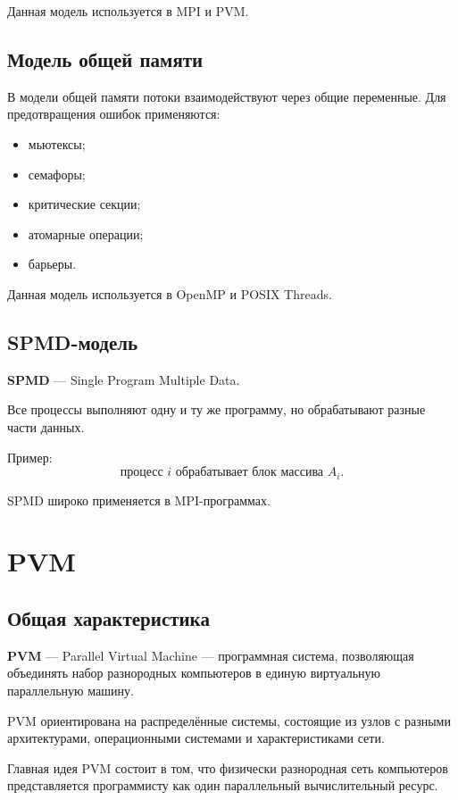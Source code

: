 \documentclass[12pt,a4paper]{article}
\begin{document}
Данная модель используется в MPI и PVM.

\subsection{Модель общей памяти}

В модели общей памяти потоки взаимодействуют через общие переменные. Для предотвращения ошибок применяются:
\begin{itemize}
    \item мьютексы;
    \item семафоры;
    \item критические секции;
    \item атомарные операции;
    \item барьеры.
\end{itemize}

Данная модель используется в OpenMP и POSIX Threads.

\subsection{SPMD-модель}

\textbf{SPMD} --- Single Program Multiple Data.

Все процессы выполняют одну и ту же программу, но обрабатывают разные части данных.

Пример:
\[
\text{процесс } i \text{ обрабатывает блок массива } A_i.
\]

SPMD широко применяется в MPI-программах.

\section{PVM}

\subsection{Общая характеристика}

\textbf{PVM} --- Parallel Virtual Machine --- программная система, позволяющая объединять набор разнородных компьютеров в единую виртуальную параллельную машину.

PVM ориентирована на распределённые системы, состоящие из узлов с разными архитектурами, операционными системами и характеристиками сети.

Главная идея PVM состоит в том, что физически разнородная сеть компьютеров представляется программисту как один параллельный вычислительный ресурс.
\end{document}
